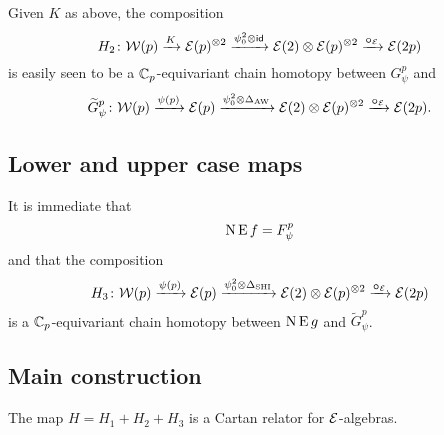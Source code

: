 Given $K$ as above, the composition
\[
H_2 \colon \mathcal{W}(p) \xrightarrow{K} \mathcal{E}(p)^{\otimes 2} \xrightarrow{\psi^2_0 \otimes \mathsf{id}} \mathcal{E}(2) \otimes \mathcal{E}(p)^{\otimes 2} \xrightarrow{\bm{\circ}_{\mathcal{E}}} \mathcal{E}(2p)
\]
is easily seen to be a $\mathbb{C}_p$-equivariant chain homotopy between $G_\psi^p$ and
\[
\widetilde G_\psi^p \colon \mathcal{W}(p) \xrightarrow{\psi(p)} \mathcal{E}(p) \xrightarrow{\psi^2_0 \otimes \Delta_{\operatorname{AW}}} \mathcal{E}(2) \otimes \mathcal{E}(p)^{\otimes 2} \xrightarrow{\bm{\circ}_{\mathcal{E}}} \mathcal{E}(2p).
\]

\subsection{Lower and upper case maps}

It is immediate that
\[
\operatorname{N}\operatorname{E} f = F_\psi^p
\]
and that the composition
\[
H_3 \colon \mathcal{W}(p) \xrightarrow{\psi(p)} \mathcal{E}(p) \xrightarrow{\psi^2_0 \otimes \Delta_{\mathrm{SHI}}} \mathcal{E}(2) \otimes \mathcal{E}(p)^{\otimes 2} \xrightarrow{\bm{\circ}_{\mathcal{E}}} \mathcal{E}(2p)
\]
is a $\mathbb{C}_p$-equivariant chain homotopy between $\operatorname{N}\operatorname{E} g$ and $\widetilde G_\psi^p$.

\subsection{Main construction}

The map $H = H_1 + H_2 + H_3$ is a Cartan relator for $\mathcal{E}$-algebras.